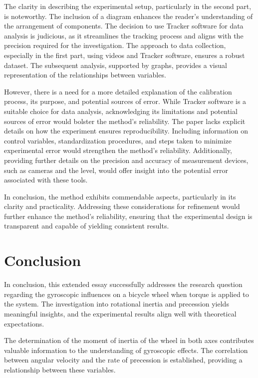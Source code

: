\documentclass{article}
\begin{document}
The clarity in describing the experimental setup, particularly in the second part, is noteworthy. The inclusion of a diagram enhances the reader's understanding of the arrangement of components. The decision to use Tracker software for data analysis is judicious, as it streamlines the tracking process and aligns with the precision required for the investigation. The approach to data collection, especially in the first part, using videos and Tracker software, ensures a robust dataset. The subsequent analysis, supported by graphs, provides a visual representation of the relationships between variables.

However, there is a need for a more detailed explanation of the calibration process, its purpose, and potential sources of error. While Tracker software is a suitable choice for data analysis, acknowledging its limitations and potential sources of error would bolster the method's reliability. The paper lacks explicit details on how the experiment ensures reproducibility. Including information on control variables, standardization procedures, and steps taken to minimize experimental error would strengthen the method's reliability. Additionally, providing further details on the precision and accuracy of measurement devices, such as cameras and the level, would offer insight into the potential error associated with these tools.

In conclusion, the method exhibits commendable aspects, particularly in its clarity and practicality. Addressing these considerations for refinement would further enhance the method's reliability, ensuring that the experimental design is transparent and capable of yielding consistent results.

\pagebreak
\section{Conclusion}
In conclusion, this extended essay successfully addresses the research question regarding the gyroscopic influences on a bicycle wheel when torque is applied to the system. The investigation into rotational inertia and precession yields meaningful insights, and the experimental results align well with theoretical expectations.

The determination of the moment of inertia of the wheel in both axes contributes valuable information to the understanding of gyroscopic effects. The correlation between angular velocity and the rate of precession is established, providing a relationship between these variables.
\end{document}
